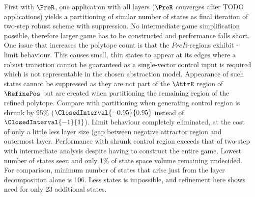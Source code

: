     First with $\PreR$, one application with all layers ($\PreR$ converges after TODO applications) yields a partitioning of similar number of states as final iteration of two-step robust scheme with suppression.
    No intermediate game simplification possible, therefore larger game has to be constructed and performance falls short.
    One issue that increases the polytope count is that the $PreR$-regions exhibit \epsilon-limit behaviour.
    This causes small, thin states to appear at its edges where a robust transition cannot be guaranteed as a single-vector control input is required which is not representable in the chosen abstraction model.
    Appearance of such states cannot be suppressed as they are not part of the $\AttrR$ region of $\RefinePos$ but are created when partitioning the remaining region of the refined polytope.
    Compare with partitioning when generating control region is shrunk by 95\% ($\ClosedInterval{-0.95}{0.95}$ instead of $\ClosedInterval{-1}{1}$).
    Limit behaviour completely eliminated, at the cost of only a little less layer size (gap between negative attractor region and outermost layer.
    Performance with shrunk control region exceeds that of two-step with intermediate analysis despite having to construct the entire game.
    Lowest number of states seen and only 1\% of state space volume remaining undecided.
    For comparison, minimum number of states that arise just from the layer decomposition alone is 106.
    Less states is impossible, and refinement here shows need for only 23 additional states.


\stopsubsection



